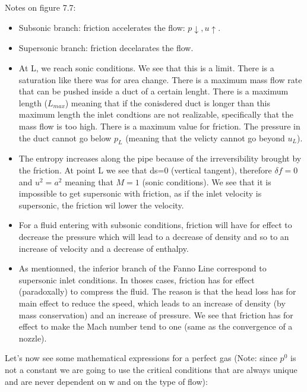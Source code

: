 Notes on figure 7.7:
\begin{itemize}
\item Subsonic branch: friction accelerates the flow: $p \downarrow, u\uparrow$.
\item Supersonic branch: friction decelarates the flow.
\item At L, we reach sonic conditions. We see that this is a limit. There is a saturation like there was for area change. There is a maximum mass flow rate that can be pushed inside a duct of a certain lenght. There is a maximum length ($L_{max}$) meaning that if the conisdered duct is longer than this maximum length the inlet condtions are not realizable, specifically that the mass flow is too high. There is a maximum value for friction. The pressure in the duct cannot go below $p_L$ (meaning that the velicty cannot go beyond $u_L$).
\item The entropy increases along the pipe because of the irreversibility brought by the friction. At point L we see that ds=0 (vertical tangent), therefore $\delta f=0$ and $u^2=a^2$ meaning that $M=1$ (sonic conditions). We see that it is impossible to get supersonic with friction, as if the inlet velocity is supersonic, the friction wil lower the velocity.
\item For a fluid entering with subsonic conditions, friction will have for effect to decrease the pressure which will lead to a decrease of density and so to an increase of velocity and a decrease of enthalpy.
\item As mentionned, the inferior branch of the Fanno Line correspond to supersonic inlet conditions. In thoses cases, friction has for effect (paradoxally) to compress the fluid. The reason is that the head loss has for main effect to reduce the speed, which leads to an increase of density (by mass conservation) and an increase of pressure. We see that friction has for effect to make the Mach number tend to one (same as the convergence of a nozzle).
\end{itemize}

Let's now see some mathematical expressions for a perfect gas (Note: since $p^0$ is not a constant we are going to use the critical conditions that are always unique and are never dependent on w and on the type of flow):

